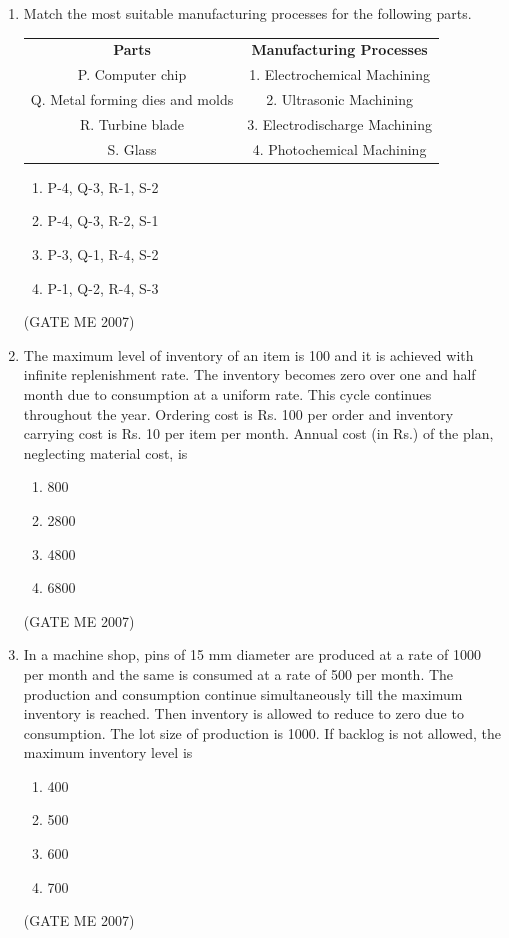 \documentclass[journal]{IEEEtran}
\begin{document}
\begin{enumerate}
\item Match the most suitable manufacturing processes for the following parts.

\begin{tabular}{cc}
\textbf{Parts}                  & \textbf{Manufacturing Processes} \\ 
P. Computer chip                & 1. Electrochemical Machining \\
Q. Metal forming dies and molds & 2. Ultrasonic Machining \\
R. Turbine blade                & 3. Electrodischarge Machining \\
S. Glass                        & 4. Photochemical Machining \\
\end{tabular}

\begin{multicols}{2}
\begin{enumerate}
\item P-4, Q-3, R-1, S-2
\item P-4, Q-3, R-2, S-1
\item P-3, Q-1, R-4, S-2
\item P-1, Q-2, R-4, S-3
\end{enumerate}
\end{multicols}
\hfill (GATE ME 2007)

\item The maximum level of inventory of an item is 100 and it is achieved with infinite replenishment rate. The inventory becomes zero over one and half month due to consumption at a uniform rate. This cycle continues throughout the year. Ordering cost is Rs. 100 per order and inventory carrying cost is Rs. 10 per item per month. Annual cost (in Rs.) of the plan, neglecting material cost, is
\begin{multicols}{4}
\begin{enumerate}
\item 800
\item 2800
\item 4800
\item 6800
\end{enumerate}
\end{multicols}
\hfill (GATE ME 2007)

\item In a machine shop, pins of 15 mm diameter are produced at a rate of 1000 per month and the same is consumed at a rate of 500 per month. The production and consumption continue simultaneously till the maximum inventory is reached. Then inventory is allowed to reduce to zero due to consumption. The lot size of production is 1000. If backlog is not allowed, the maximum inventory level is
\begin{multicols}{4}
\begin{enumerate}
\item 400
\item 500
\item 600
\item 700
\end{enumerate}
\end{multicols}
\hfill (GATE ME 2007)


\end{enumerate}
\end{document}
